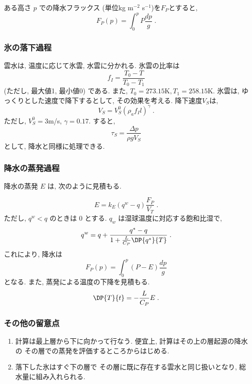 ある高さ $p$ での降水フラックス
(単位kg m$^{-2}$ s$^{-1}$)を$F_P$とすると,
\begin{equation}
  F_P(p) = \int_0^p P \frac{dp}{g} \; .
\end{equation}

\subsubsection{氷の落下過程}

雲水は, 温度に応じて氷雲, 水雲に分かれる.
氷雲の比率は
\begin{equation}
   f_I = \frac{ T_0 - T }{ T_0 - T_1 }
\end{equation}
(ただし, 最大値1, 最小値0) である. また,
$T_0 = 273.15\mbox{K}, T_1 = 258.15\mbox{K}$.
氷雲は, ゆっくりとした速度で降下するとして, 
その効果を考える. 降下速度$V_S$は,
\begin{equation}
  V_S = V_S^0 ( \rho_a f_I l )^\gamma \; .
\end{equation}
ただし, $V_S^0=3$m/s, $\gamma=0.17$.
すると, 
\begin{equation}
  \tau_S = \frac{\Delta p}{\rho g V_S} 
\end{equation}
として, 降水と同様に処理できる.

\subsubsection{降水の蒸発過程}

降水の蒸発 $E$ は, 次のように見積もる.

\begin{equation}
E = k_E (q^w - q) \frac{F_P}{V_T} \; .
\end{equation}
ただし, $q^w < q$ のときは 0 とする.
$q_w$ は湿球温度に対応する飽和比湿で,
\begin{equation}
  q^w = q + \frac{q^* - q}{1+ \frac{L}{C_P}\DP{q^*}{T}} \; .
\end{equation}
%
これにより, 降水は
\begin{equation}
  F_P(p) = \int_0^p (P - E) \frac{dp}{g}
\end{equation}
となる. また, 蒸発による温度の下降を見積もる.
\begin{equation}
  \DP{T}{t} = - \frac{L}{C_P} E \; .
\end{equation}

\subsubsection{その他の留意点}

\begin{enumerate}
\item 計算は最上層から下に向かって行なう.
      便宜上, 計算はその上の層起源の降水の
      その層での蒸発を評価するところからはじめる.
\item 落下した氷はすぐ下の層で
      その層に既に存在する雲水と同じ扱いとなり,
      総水量に組み入れられる.
\end{enumerate}


